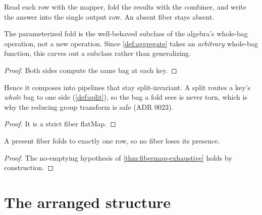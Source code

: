 \begin{definition}
  \label{def:foldfiber}\leanok
  Read each row with the mapper, fold the results with the combiner, and
  write the answer into the single output row.  An absent fiber stays
  absent.
\end{definition}

\begin{theorem}
  \label{thm:foldfiber-eq-aggregate}\leanok
  The parameterized fold is the well-behaved subclass of the algebra's
  whole-bag operation, not a new operation.  Since \ref{def:aggregate}
  takes an \emph{arbitrary} whole-bag function, this carves out a
  subclass rather than generalizing.
\end{theorem}
\begin{proof}\leanok
  Both sides compute the same bag at each key.
\end{proof}

\begin{theorem}
  \label{thm:foldfiber-splitsafe}\leanok
  Hence it composes into pipelines that stay split-invariant.  A split
  routes a key's \emph{whole} bag to one side (\ref{def:split}), so the
  bag a fold sees is never torn, which is why the reducing group
  transform is safe (ADR 0023).
\end{theorem}
\begin{proof}\leanok
  It is a strict fiber flatMap.
\end{proof}

\begin{theorem}
  \label{thm:foldfiber-exhaustive}\leanok
  A present fiber folds to exactly one row, so no fiber loses its
  presence.
\end{theorem}
\begin{proof}\leanok
  The no-emptying hypothesis of \ref{thm:fibermap-exhaustive} holds by
  construction.
\end{proof}

\section{The arranged structure}

